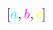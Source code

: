 \documentclass[preview]{standalone}
\begin{document}
$\left[\textcolor[HTML]{00FFFF}{a}, \textcolor[HTML]{FF00FF}{b}, \textcolor[HTML]{FFFF00}{c}\right]$
\end{document}
